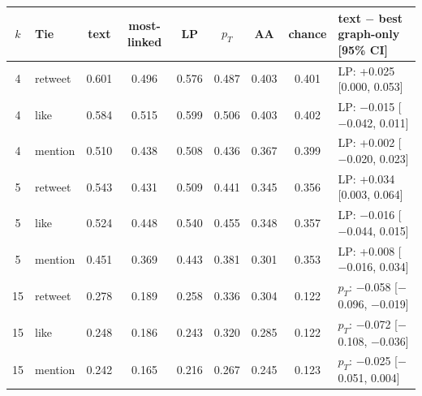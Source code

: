 \begin{tabularx}{\linewidth}{@{}cl cccccc >{\raggedright\arraybackslash}X@{}}
\toprule
$k$ & Tie & text & most-linked & LP & $p_T$ & AA & chance & text $-$ best graph-only [95\% CI]\\
\midrule
4 & retweet & 0.601 & 0.496 & 0.576 & 0.487 & 0.403 & 0.401 & LP: +0.025 [0.000, 0.053] \\
4 & like & 0.584 & 0.515 & 0.599 & 0.506 & 0.403 & 0.402 & LP: $-$0.015 [$-$0.042, 0.011] \\
4 & mention & 0.510 & 0.438 & 0.508 & 0.436 & 0.367 & 0.399 & LP: +0.002 [$-$0.020, 0.023] \\
\midrule
5 & retweet & 0.543 & 0.431 & 0.509 & 0.441 & 0.345 & 0.356 & LP: +0.034 [0.003, 0.064] \\
5 & like & 0.524 & 0.448 & 0.540 & 0.455 & 0.348 & 0.357 & LP: $-$0.016 [$-$0.044, 0.015] \\
5 & mention & 0.451 & 0.369 & 0.443 & 0.381 & 0.301 & 0.353 & LP: +0.008 [$-$0.016, 0.034] \\
\midrule
15 & retweet & 0.278 & 0.189 & 0.258 & 0.336 & 0.304 & 0.122 & $p_T$: $-$0.058 [$-$0.096, $-$0.019] \\
15 & like & 0.248 & 0.186 & 0.243 & 0.320 & 0.285 & 0.122 & $p_T$: $-$0.072 [$-$0.108, $-$0.036] \\
15 & mention & 0.242 & 0.165 & 0.216 & 0.267 & 0.245 & 0.123 & $p_T$: $-$0.025 [$-$0.051, 0.004] \\
\bottomrule
\end{tabularx}
